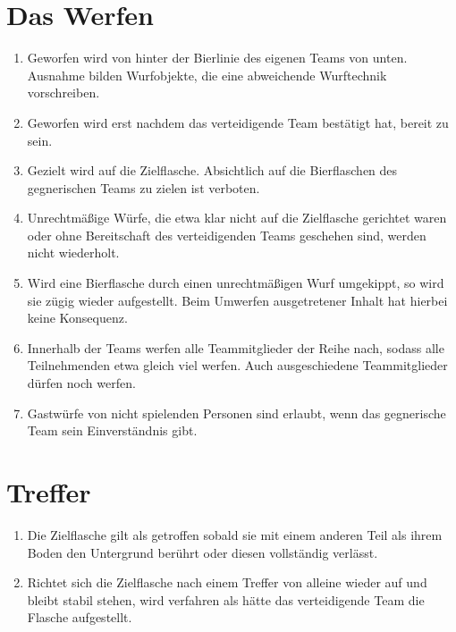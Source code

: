 \section{Das Werfen}
\begin{enumerate}[label={(\arabic*)}]
    \item
    Geworfen wird von hinter der Bierlinie des eigenen Teams von unten.
    Ausnahme bilden Wurfobjekte, die eine abweichende Wurftechnik vorschreiben.

    \item
    Geworfen wird erst nachdem das verteidigende Team bestätigt hat, bereit zu sein.

    \item
    Gezielt wird auf die Zielflasche.
    Absichtlich auf die Bierflaschen des gegnerischen Teams zu zielen ist verboten.

    \item
    Unrechtmäßige Würfe, die etwa klar nicht auf die Zielflasche gerichtet waren oder ohne Bereitschaft des verteidigenden Teams geschehen sind, werden nicht wiederholt.

    \item
    Wird eine Bierflasche durch einen unrechtmäßigen Wurf umgekippt, so wird sie zügig wieder aufgestellt.
    Beim Umwerfen ausgetretener Inhalt hat hierbei keine Konsequenz.

    \item
    Innerhalb der Teams werfen alle Teammitglieder der Reihe nach, sodass alle Teilnehmenden etwa gleich viel werfen.
    Auch ausgeschiedene Teammitglieder dürfen noch werfen.

    \item
    Gastwürfe von nicht spielenden Personen sind erlaubt, wenn das gegnerische Team sein Einverständnis gibt.
\end{enumerate}

\section{Treffer}
\begin{enumerate}[label={(\arabic*)}]
    \item\label{Flunkyball:Treffer:Allg}
    Die Zielflasche gilt als getroffen sobald sie mit einem anderen Teil als ihrem Boden den Untergrund berührt oder diesen vollständig verlässt.

    \item 
    Richtet sich die Zielflasche nach einem Treffer von alleine wieder auf und bleibt stabil stehen, wird verfahren als hätte das verteidigende Team die Flasche aufgestellt.
\end{enumerate}

